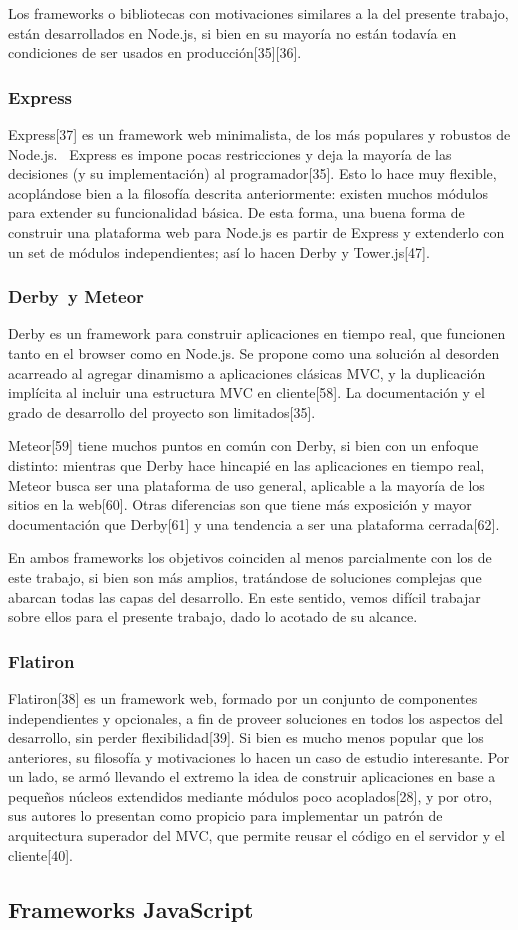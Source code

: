 \documentclass[doc,helv,longtable]{article}
\begin{document}
Los frameworks o bibliotecas con motivaciones similares a la del presente trabajo, están desarrollados en Node.js, si bien en su mayoría no están todavía en condiciones de ser usados en producción[35][36].\subsubsection{Express}


Express[37] es un framework web minimalista, de los más populares y robustos de Node.js.  Express es impone pocas restricciones y deja la mayoría de las decisiones (y su implementación) al programador[35]. Esto lo hace muy flexible, acoplándose bien a la filosofía descrita anteriormente: existen muchos módulos para extender su funcionalidad básica. De esta forma, una buena forma de construir una plataforma web para Node.js es partir de Express y extenderlo con un set de módulos independientes; así lo hacen Derby y Tower.js[47].\subsubsection{Derby y Meteor}


Derby es un framework para construir aplicaciones en tiempo real, que funcionen tanto en el browser como en Node.js. Se propone como una solución al desorden acarreado al agregar dinamismo a aplicaciones clásicas MVC, y la duplicación implícita al incluir una estructura MVC en cliente[58]. La documentación y el grado de desarrollo del proyecto son limitados[35].

Meteor[59] tiene muchos puntos en común con Derby, si bien con un enfoque distinto: mientras que Derby hace hincapié en las aplicaciones en tiempo real, Meteor busca ser una plataforma de uso general, aplicable a la mayoría de los sitios en la web[60]. Otras diferencias son que tiene más exposición y mayor documentación que Derby[61] y una tendencia a ser una plataforma cerrada[62].

En ambos frameworks los objetivos coinciden al menos parcialmente con los de este trabajo, si bien son más amplios, tratándose de soluciones complejas que abarcan todas las capas del desarrollo. En este sentido, vemos difícil trabajar sobre ellos para el presente trabajo, dado lo acotado de su alcance.\subsubsection{Flatiron}


Flatiron[38] es un framework web, formado por un conjunto de componentes independientes y opcionales, a fin de proveer soluciones en todos los aspectos del desarrollo, sin perder flexibilidad[39]. Si bien es mucho menos popular que los anteriores, su filosofía y motivaciones lo hacen un caso de estudio interesante. Por un lado, se armó llevando el extremo la idea de construir aplicaciones en base a pequeños núcleos extendidos mediante módulos poco acoplados[28], y por otro, sus autores lo presentan como propicio para implementar un patrón de arquitectura superador del MVC, que permite reusar el código en el servidor y el cliente[40]. \subsection{Frameworks JavaScript}
\end{document}
